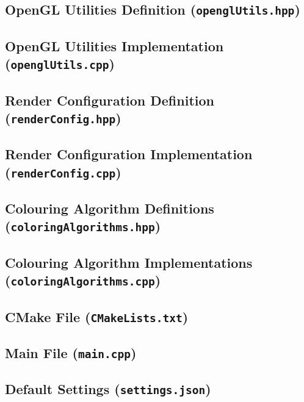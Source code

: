 \pagebreak

\subsection{OpenGL Utilities Definition (\texttt{openglUtils.hpp})}


\subsection{OpenGL Utilities Implementation (\texttt{openglUtils.cpp})}



\pagebreak

\subsection{Render Configuration Definition (\texttt{renderConfig.hpp})}


\subsection{Render Configuration Implementation (\texttt{renderConfig.cpp})}



\pagebreak

\subsection{Colouring Algorithm Definitions (\texttt{coloringAlgorithms.hpp})}


\subsection{Colouring Algorithm Implementations \\ (\texttt{coloringAlgorithms.cpp})}



\pagebreak

\subsection{CMake File (\texttt{CMakeLists.txt})}


\subsection{Main File (\texttt{main.cpp})}



\pagebreak

\subsection{Default Settings (\texttt{settings.json})}

